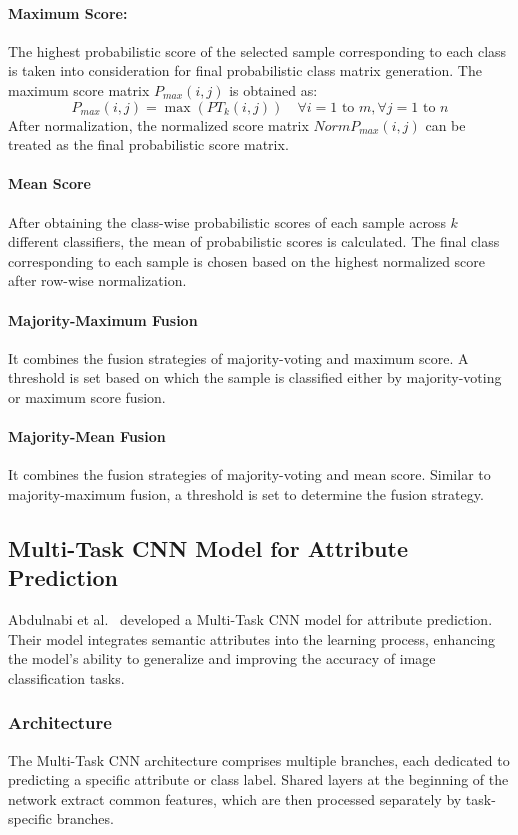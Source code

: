 \documentclass[journal, biblatex]{IEEEtran}
\begin{document}
\paragraph{Maximum Score:} The highest probabilistic score of the selected sample corresponding to each class is taken into consideration for final probabilistic class matrix generation. The maximum score matrix $P_{max}(i,j)$ is obtained as:
\[
    P_{max}(i,j) = \max(PT_k(i,j)) \quad \forall i = 1 \text{ to } m, \forall j = 1 \text{ to } n 
\]
After normalization, the normalized score matrix $NormP_{max}(i,j)$ can be treated as the final probabilistic score matrix.

\paragraph{Mean Score} After obtaining the class-wise probabilistic scores of each sample across $k$ different classifiers, the mean of probabilistic scores is calculated. The final class corresponding to each sample is chosen based on the highest normalized score after row-wise normalization.

\paragraph{Majority-Maximum Fusion} It combines the fusion strategies of majority-voting and maximum score. A threshold is set based on which the sample is classified either by majority-voting or maximum score fusion.

\paragraph{Majority-Mean Fusion} It combines the fusion strategies of majority-voting and mean score. Similar to majority-maximum fusion, a threshold is set to determine the fusion strategy.

\subsection[Multi-Task CNN Model for Attribute Prediction]{Multi-Task CNN Model for Attribute Prediction}
Abdulnabi et al.~\cite{abdulnabi2015} developed a Multi-Task CNN model for attribute prediction. Their model integrates semantic attributes into the learning process, enhancing the model's ability to generalize and improving the accuracy of image classification tasks.

\subsubsection{Architecture}
The Multi-Task CNN architecture comprises multiple branches, each dedicated to predicting a specific attribute or class label. Shared layers at the beginning of the network extract common features, which are then processed separately by task-specific branches.
\end{document}

